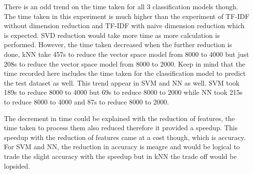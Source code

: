 There is an odd trend on the time taken for all 3 classification models though. The time taken in this experiment is much higher than the experiment of TF-IDF without dimension reduction and TF-IDF with naive dimension reduction which is expected. SVD reduction would take more time as more calculation is performed. However, the time taken decreased when the further reduction is done, kNN take 457s to reduce the vector space model from 8000 to 4000 but just 208s to reduce the vector space model from 8000 to 2000. Keep in mind that the time recorded here includes the time taken for the classification model to predict the test dataset as well. This trend appear in SVM and NN as well. SVM took 189s to reduce 8000 to 4000 but 69s to reduce 8000 to 2000 while NN took 215s to reduce 8000 to 4000 and 87s to reduce 8000 to 2000. 

The decrement in time could be explained with the reduction of features, the time taken to process them also reduced therefore it provided a speedup. This speedup with the reduction of features came at a cost though, which is accuracy. For SVM and NN, the reduction in accuracy is meagre and would be logical to trade the slight accuracy with the speedup but in kNN the trade off would be lopsided.